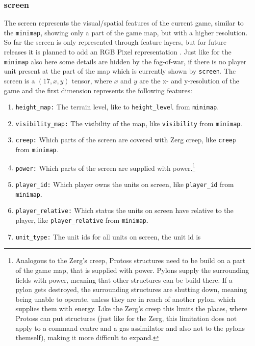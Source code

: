 \documentclass{article}
\begin{document}
\subsubsection{screen}
The screen represents the visual/spatial features of the current game, similar 
to the \texttt{minimap}, showing only a part of the game map, but with a higher 
resolution. So far the screen is only represented through feature layers, but 
for future releases it is planned to add an RGB Pixel representation 
\cite{Vinyals2017}. Just like for the \texttt{minimap} also here some details 
are hidden by the fog-of-war, if there is no player unit present at the part of 
the map which is currently shown by \texttt{screen}. The screen is a $(17, x, 
y)$ tensor, where $x$ and $y$ are the x- and y-resolution of the game and the 
first dimension represents the following features:
\begin{enumerate}[noitemsep,start=0]
\item \texttt{height\_map:} The terrain level, like to \texttt{height\_level} 
from \texttt{minimap}.
\item \texttt{visibility\_map:} The visibility of the map, like 
\texttt{visibility} from \texttt{minimap}.
\item \texttt{creep:} Which parts of the screen are covered with Zerg creep, 
like \texttt{creep} from \texttt{minimap}.
\item \texttt{power:} Which parts of the screen are supplied with 
power.\footnote{Analogous to the Zerg's creep, Protoss structures need to be 
build on a part of the game map, that is supplied with power. Pylons supply the 
surrounding fields with power, meaning that other structures can be build 
there. If a pylon gets destroyed, the surrounding structures are shutting down, 
meaning being unable to operate, unless they are in reach of another pylon, 
which supplies them with energy. Like the Zerg's creep this limits the places, 
where Protoss can put structures (just like for the Zerg, this limitation does 
not apply to a command centre and a gas assimilator and also not to the pylons 
themself), making it more difficult to expand.}
\item \texttt{player\_id:} Which player owns the units on screen, like 
\texttt{player\_id} from \texttt{minimap}.
\item \texttt{player\_relative:} Which status the units on screen have relative 
to the player, like \texttt{player\_relative} from \texttt{minimap}.
\item \texttt{unit\_type:} The unit ids for all units on screen, the unit id is 

\end{enumerate}
\end{document}
